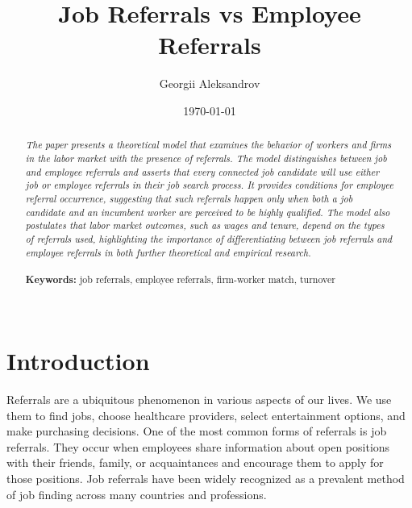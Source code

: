 \documentclass[12pt]{article}
\begin{document}
\begin{titlepage}
\title{Job Referrals vs Employee Referrals}%
\author{Georgii Aleksandrov}%
\date{\today}
\maketitle
\begin{abstract}
\noindent \textit{The paper presents a theoretical model that examines the behavior of workers and firms in the labor market with the presence of referrals. The model distinguishes between job and employee referrals and asserts that every connected job candidate will use either job or employee referrals in their job search process. It provides conditions for employee referral occurrence, suggesting that such referrals happen only when both a job candidate and an incumbent worker are perceived to be highly qualified. The model also postulates that labor market outcomes, such as wages and tenure, depend on the types of referrals used, highlighting the importance of differentiating between job referrals and employee referrals in both further theoretical and empirical research.}\\
\vspace{0in}\\
\noindent\textbf{Keywords:} job referrals, employee referrals, firm-worker match, turnover\\
\vspace{0in}\\

\bigskip
\end{abstract}
\setcounter{page}{0}
\thispagestyle{empty}
\end{titlepage}
\pagebreak \newpage




\doublespacing


\section{Introduction} \label{sec:introduction}
Referrals are a ubiquitous phenomenon in various aspects of our lives. We use them to find jobs, choose healthcare providers, select entertainment options, and make purchasing decisions. One of the most common forms of referrals is job referrals. They occur when employees share information about open positions with their friends, family, or acquaintances and encourage them to apply for those positions. Job referrals have been widely recognized as a prevalent method of job finding across many countries and professions. 
\end{document}
